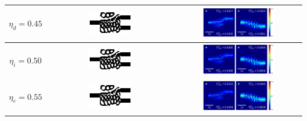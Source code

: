 \begin{table}[ht]
    \centering
    \hspace*{-3cm}
    \begin{tabular}{|c|c|c|}
    \hline
      $\eta_d = 0.45$ &
      \includegraphics[width=0.35\textwidth]{image/results/wdm/L-BFGS-B/best/eps_eta_d_128.png } &
      \includegraphics[width=0.60\textwidth]{image/results/wdm/L-BFGS-B/best/field_eta_d_128.png} \\
    \hline
      $\eta_i = 0.50$ &
      \includegraphics[width=0.35\textwidth]{image/results/wdm/L-BFGS-B/best/eps_eta_i_128.png} &
      \includegraphics[width=0.60\textwidth]{image/results/wdm/L-BFGS-B/best/field_eta_i_128.png} \\
    \hline
      $\eta_e = 0.55$ &
      \includegraphics[width=0.35\textwidth]{image/results/wdm/L-BFGS-B/best/eps_eta_e_128.png} &
      \includegraphics[width=0.60\textwidth]{image/results/wdm/L-BFGS-B/best/field_eta_e_128.png} \\

\end{tabular}
\end{table}
